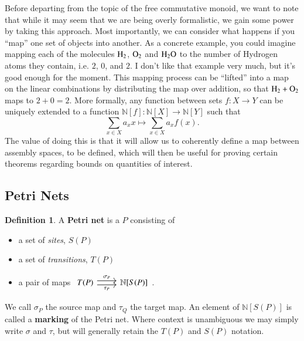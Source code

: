 \documentclass[aps,prd,onecolumn,nofootinbib,letterpaper,preprintnumbers,superscriptaddress,eqsecnum]{revtex4}
\theoremstyle{definition}
\newtheorem{definition}{Definition}
\newcommand{\N}{\mathbb{N}}
\newcommand{\red}[1]{{\color{red}#1}}
\begin{document}
Before departing from the topic of the free commutative monoid, we want to note that while it may seem that we are being overly formalistic, we gain some power by taking this approach.
Most importantly, we can consider what happens if you ``map'' one set of objects into another. 
As a concrete example, you could imagine mapping each of the molecules $\ce{H_2}$, $\ce{O_2}$ and $\ce{H_2O}$ to the number of Hydrogen atoms they contain, i.e. $2$, $0$, and $2$.
\red{I don't like that example very much, but it's good enough for the moment.}
This mapping process can be ``lifted'' into a map on the linear combinations by distributing the map over addition, so that $\ce{H_2} + \ce{O_2}$ maps to $2 + 0 = 2$. More formally, any function between sets $f : X \rightarrow Y$ can be uniquely extended to a function $\N[f] : \N[X] \rightarrow \N[Y]$ such that
\begin{equation*}
    \sum_{x \in X} a_x x \mapsto \sum_{x \in X} a_x f(x).
\end{equation*}
The value of doing this is that it will allow us to coherently define a map between assembly spaces, to be defined, which will then be useful for proving certain theorems regarding bounds on quantities of interest.

\subsection{Petri Nets}

\begin{definition}\label{def:petri}
    A \textbf{Petri net} is a $P$ consisting of
    \begin{itemize}
        \item a set of \textit{sites}, $S(P)$
        \item a set of \textit{transitions}, $T(P)$
        \item a pair of maps $\begin{tikzcd}
                T(P)
                \arrow[r, shift left = 1, "\sigma_P"]
                \arrow[r, shift right = 1, "\tau_P", swap]
                &
                \N[S(P)]
        \end{tikzcd}$.
    \end{itemize}
    We call $\sigma_P$ the source map and $\tau_Q$ the target map.
    An element of $\N[S(P)]$ is called a \textbf{marking} of the Petri net.
    Where context is unambiguous we may simply write $\sigma$ and $\tau$, but will generally retain the $T(P)$ and $S(P)$ notation.
\end{definition}
\end{document}
